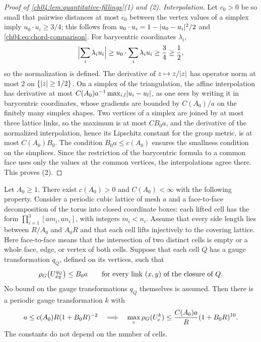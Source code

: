 \begin{proof}[Proof of \cref{ch04:lem:quantitative-fillings}(1) and (2)]
\emph{Interpolation.} Let $c_0>0$ be so small that pairwise distances at most $c_0$ between the vertex values of a simplex imply $u_0\cdot u_i\ge3/4$; this follows from $u_0\cdot u_i=1-\lvert u_0-u_i\rvert^2/2$ and \eqref{ch04:eq:chord-comparison}. For barycentric coordinates $\lambda_i$,
\[
 \Bigl\lvert\sum_i\lambda_iu_i\Bigr\rvert\ge u_0\cdot\sum_i\lambda_iu_i\ge\frac34\ge\frac12,
\]
so the normalization is defined. The derivative of $z\mapsto z/\lvert z\rvert$ has operator norm at most $2$ on $\{\lvert z\rvert\ge1/2\}$. On a simplex of the triangulation, the affine interpolation has derivative at most $C(A_0)a^{-1}\max_{i,l}\lvert u_i-u_l\rvert$, as one sees by writing it in barycentric coordinates, whose gradients are bounded by $C(A_0)/a$ on the finitely many simplex shapes. Two vertices of a simplex are joined by at most three lattice links, so the maximum is at most $CB_0a$, and the derivative of the normalized interpolation, hence its Lipschitz constant for the group metric, is at most $C(A_0)B_0$. The condition $B_0a\le c(A_0)$ ensures the smallness condition on the simplices. Since the restriction of the barycentric formula to a common face uses only the values at the common vertices, the interpolations agree there. This proves (2).
\end{proof}

\begin{lemma}\label{ch04:lem:cell-gluing}
Let $A_0\ge1$. There exist $c(A_0)>0$ and $C(A_0)<\infty$ with the following property. Consider a periodic cubic lattice of mesh $a$ and a face-to-face decomposition of the torus into closed coordinate boxes: each lifted cell has the form $\prod_{i=1}^3[am_i,an_i]$, with integers $m_i<n_i$. Assume that every side length lies between $R/A_0$ and $A_0R$ and that each cell lifts injectively to the covering lattice. Here face-to-face means that the intersection of two distinct cells is empty or a whole face, edge, or vertex of both cells. Suppose that each cell $Q$ has a gauge transformation $q_Q$, defined on its vertices, such that
\begin{equation}\label{ch04:eq:frame-hypothesis}
 \rho_G\bigl(U^{q_Q}_{xy}\bigr)\le B_0a\qquad\text{for every link $(x,y)$ of the closure of $Q$}.
\end{equation}
No bound on the gauge transformations $q_Q$ themselves is assumed. Then there is a periodic gauge transformation $k$ with
\begin{equation}\label{ch04:eq:general-skeleton}
 a\le c(A_0)R(1+B_0R)^{-2}\quad\Longrightarrow\quad\max_e\rho_G(U^k_e)\le\frac{C(A_0)a}R(1+B_0R)^{10}.
\end{equation}
The constants do not depend on the number of cells.
\end{lemma}

